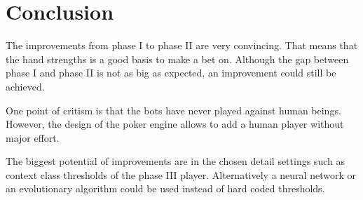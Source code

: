 \chapter{Conclusion}
The improvements from phase I to phase II are very convincing. That means that the hand strengths is a good basis to make a bet on. Although the gap between phase I and phase II is not as big as expected, an improvement could still be achieved.

One point of critism is that the bots have never played against human beings. However, the design of the poker engine allows to add a human player without major effort.

The biggest potential of improvements are in the chosen detail settings such as context class thresholds of the phase III player. Alternatively a neural network or an evolutionary algorithm could be used instead of hard coded thresholds.
